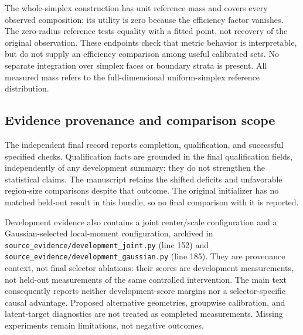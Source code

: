\documentclass{article}
\begin{document}
The whole-simplex construction has unit reference mass and covers every observed composition; its utility is zero because the efficiency factor vanishes. The zero-radius reference tests equality with a fitted point, not recovery of the original observation. These endpoints check that metric behavior is interpretable, but do not supply an efficiency comparison among useful calibrated sets. No separate integration over simplex faces or boundary strata is present. All measured mass refers to the full-dimensional uniform-simplex reference distribution. %

\subsection{Evidence provenance and comparison scope}
The independent final record reports completion, qualification, and successful specified checks. Qualification facts are grounded in the final qualification fields, independently of any development summary; they do not strengthen the statistical claims. The manuscript retains the shifted deficits and unfavorable region-size comparisons despite that outcome. The original initializer has no matched held-out result in this bundle, so no final comparison with it is reported. %

Development evidence also contains a joint center/scale configuration and a Gaussian-selected local-moment configuration, archived in \texttt{source\_evidence/development\_joint.py} (line 152) and \texttt{source\_evidence/development\_gaussian.py} (line 185). They are provenance context, not final selector ablations: their scores are development measurements, not held-out measurements of the same controlled intervention. The main text consequently reports neither development-score margins nor a selector-specific causal advantage. Proposed alternative geometries, groupwise calibration, and latent-target diagnostics are not treated as completed measurements. Missing experiments remain limitations, not negative outcomes. %
\end{document}
